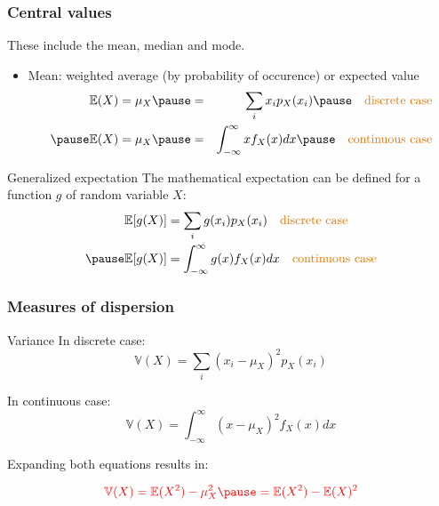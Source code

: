 \documentclass[usenames,dvipsnames,smaller]{beamer}
\newcommand{\?}{\stackrel{?}{=}}
\newcommand{\rd}{\color{red}}
\newcommand{\og}{\color{orange!90!black}}
\begin{document}
\begin{frame}
  \frametitle{Central values} \pause
  These include the mean, median and mode. \pause

  \begin{itemize}[<+->]
  \item Mean: weighted average (by probability of occurence) or expected value \pause
    \begin{eqnarray}
      \mathbb{E}(X) = \mu_{X} \pause &=& \sum_i x_i p_X(x_i) \pause \quad \text{\og discrete case}\\ \pause
      \mathbb{E}(X) = \mu_{X} \pause &=& \int_{-\infty}^{\infty}xf_X(x)dx \pause \quad \text{\og continuous case}
    \end{eqnarray}
  \end{itemize}
  \pause
 
  \begin{block}{Generalized expectation} \pause
  The mathematical expectation can be defined for a function $g$ of random variable $X$:\pause
     \begin{align}
      \mathbb{E}[g(X)] &= \sum_i g(x_i) p_X(x_i) \quad \text{\og discrete case}\\ \pause
      \mathbb{E}[g(X)] &= \int_{-\infty}^{\infty}g(x)f_X(x)dx \quad \text{\og continuous case}
    \end{align}
  \end{block}
\end{frame}

 
\begin{frame}
  \frametitle{Measures of dispersion} \pause
  \begin{block}{Variance}\pause
    In  discrete case: \pause
    \begin{equation}
      \label{eq:var}
      \mathbb{V}(X) = \sum_i(x_i - \mu_X)^2p_X(x_i)
    \end{equation}
    \pause

    In  continuous case:\pause
    \begin{equation}
      \label{eq:2}
      \mathbb{V}(X) = \int_{-\infty}^{\infty}(x - \mu_X)^2 f_X(x)dx
    \end{equation}
    \pause

    Expanding both equations results in:
    
    \begin{equation}
      \label{eq:3}\rd
      \mathbb{V}(X) = \mathbb{E}(X^2) - \mu_X^2 \pause = \mathbb{E}(X^{2}) - \mathbb{E}(X)^{2}
    \end{equation}
  \end{block}
\end{frame}
\end{document}
